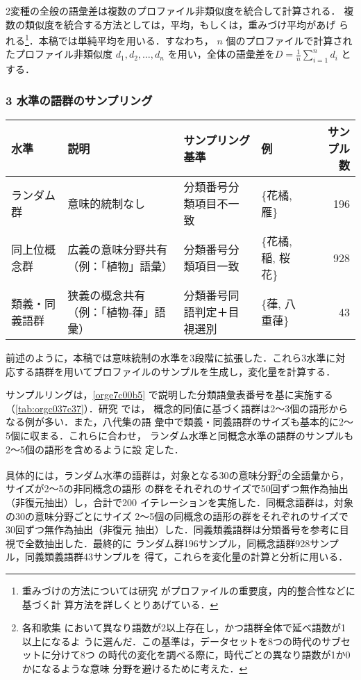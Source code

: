 \documentclass[submit]{ipsj}
\renewcommand{\ref}{\cref}
\begin{document}
2変種の全般の語彙差は複数のプロファイル非類似度を統合して計算される．
複数の類似度を統合する方法としては，平均，もしくは，重みづけ平均があげ
られる\footnote{重みづけの方法については研究 \cite{Ruette2014Semantic} がプロファイルの重要度，内的整合性などに基づく計
算方法を詳しくとりあげている．}．本稿では単純平均を用いる．すなわち，
\(n\) 個のプロファイルで計算されたプロファイル非類似度 \(d_1, d_2,
\ldots, d_n\) を用い，全体の語彙差を\(D=\frac{1}{n} \sum_{i=1}^{n}
d_i\) とする．
\subsubsection{3 水準の語群のサンプリング\label{orgb45eb45}}
\label{sec:org98e4d78}
\begin{table*}[t]
\caption{\label{tab:orgc037c37}3水準の語形集合のサンプル例}
\centering
\begin{tabular}{llllr}
水準 & 説明 & サンプリング基準 & 例 & サンプル数\\
\hline
ランダム群 & 意味的統制なし & 分類番号分類項目不一致 & \{花橘, 雁\} & 196\\
同上位概念群 & 広義の意味分野共有（例：「植物」語彙） & 分類番号分類項目一致 & \{花橘, 稲, 桜花\} & 928\\
類義・同義語群 & 狭義の概念共有（例：「植物-葎」語彙） & 分類番号同語判定＋目視選別 & \{葎, 八重葎\} & 43\\
\end{tabular}
\end{table*}

前述のように，本稿では意味統制の水準を3段階に拡張した．これら3水準に対
応する語群を用いてプロファイルのサンプルを生成し，変化量を計算する．

サンプルリングは，\ref{orge7c00b5} で説明した分類語彙表番号を基に実施する
（\ref{tab:orgc037c37}）．研究 \cite{Speelman2003Profilebased} では，
概念的同値に基づく語群は2～3個の語形からなる例が多い．また，八代集の語
彙中で類義・同義語群のサイズも基本的に2～5個に収まる．これらに合わせ，
ランダム水準と同概念水準の語群のサンプルも2～5個の語形を含めるように設
定した．

具体的には，ランダム水準の語群は，対象となる30の意味分野\footnote{各和歌集
において異なり語数が2以上存在し，かつ語群全体で延べ語数が1以上になるよ
うに選んだ．この基準は，データセットを8つの時代のサブセットに分けて8つ
の時代の変化を調べる際に，時代ごとの異なり語数が1か0かになるような意味
分野を避けるために考えた．}の全語彙から，サイズが2～5の非同概念の語形
の群をそれぞれのサイズで50回ずつ無作為抽出（非復元抽出）し，合計で200
イテレーションを実施した．同概念語群は，対象の30の意味分野ごとにサイズ
2～5個の同概念の語形の群をそれぞれのサイズで30回ずつ無作為抽出（非復元
抽出）した．同義類義語群は分類番号を参考に目視で全数抽出した．最終的に
ランダム群196サンプル，同概念語群928サンプル，同義類義語群43サンプルを
得て，これらを変化量の計算と分析に用いる．
\end{document}

